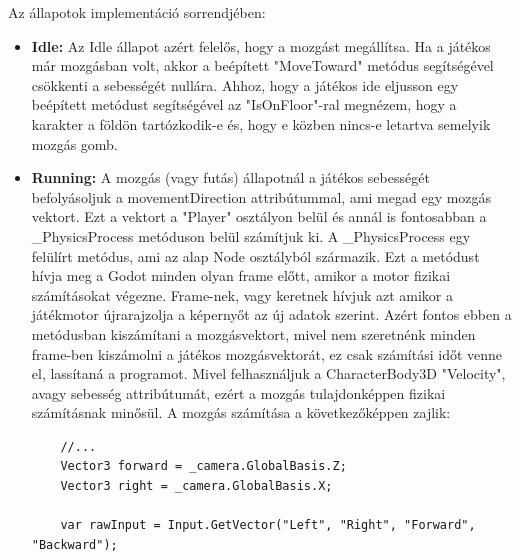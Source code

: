 Az állapotok implementáció sorrendjében:
\begin{itemize}
	\item \textbf{Idle:} Az Idle állapot azért felelős, hogy a mozgást megállítsa. Ha a játékos már mozgásban volt, akkor a beépített "MoveToward" metódus segítségével csökkenti a sebességét nullára. Ahhoz, hogy a játékos ide eljusson egy beépített metódust segítségével az "IsOnFloor"-ral megnézem, hogy a karakter a földön tartózkodik-e és, hogy e közben nincs-e letartva semelyik mozgás gomb.\\
	\item \textbf{Running:} A mozgás (vagy futás) állapotnál a játékos sebességét befolyásoljuk a movementDirection attribútummal, ami megad egy mozgás vektort. Ezt a vektort a "Player" osztályon belül és annál is fontosabban a \_PhysicsProcess metóduson belül számítjuk ki. A \_PhysicsProcess egy felülírt metódus, ami az alap Node osztályból származik. Ezt a metódust hívja meg a Godot minden olyan frame előtt, amikor a motor fizikai számításokat végezne. Frame-nek, vagy keretnek hívjuk azt amikor a játékmotor újrarajzolja a képernyőt az új adatok szerint. Azért fontos ebben a metódusban kiszámítani a mozgásvektort, mivel nem szeretnénk minden frame-ben kiszámolni a játékos mozgásvektorát, ez csak számítási időt venne el, lassítaná a programot. Mivel felhasználjuk a CharacterBody3D "Velocity", avagy sebesség attribútumát, ezért a mozgás tulajdonképpen fizikai számításnak minősül. A mozgás számítása a következőképpen zajlik:
	\lstset{style=sharpc}
	\begin{lstlisting}
	//...
	Vector3 forward = _camera.GlobalBasis.Z;
	Vector3 right = _camera.GlobalBasis.X;
		
	var rawInput = Input.GetVector("Left", "Right", "Forward", "Backward");
		

\end{lstlisting}
\end{itemize}
